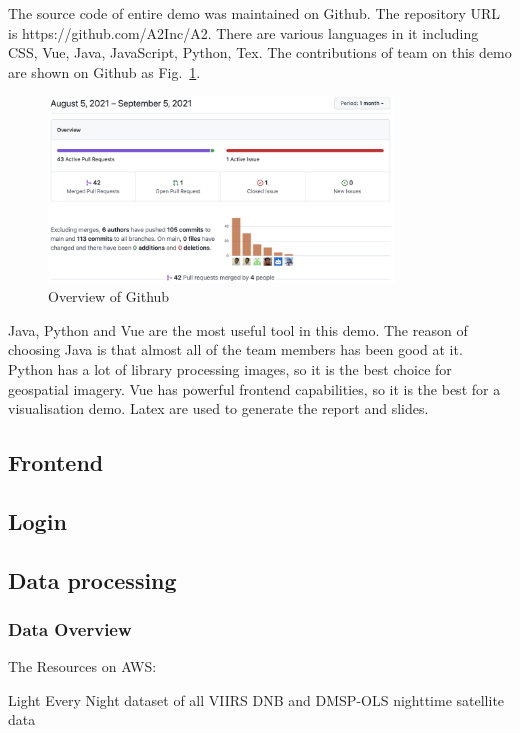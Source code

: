 \documentclass[conference]{IEEEtran}
\begin{document}
The source code of entire demo was maintained on Github. The repository URL is https://github.com/A2Inc/A2. There are various languages in it including 
CSS, Vue, Java, JavaScript, Python, Tex. The contributions of team on this demo are shown on Github as Fig.~\ref{fig3}.

\begin{figure}[htbp]
    \centerline{\includegraphics[width=260pt]{images/github.png}}
    \caption{Overview of Github}
    \label{fig3}
\end{figure}

Java, Python and Vue are the most useful tool in this demo. The reason of choosing Java is that almost all of the team members has been good at it. Python 
has a lot of library processing images, so it is the best choice for geospatial imagery. Vue has powerful frontend capabilities, so it is the best for a 
visualisation demo. Latex are used to generate the report and slides.

\subsection{Frontend}

\subsection{Login}

\subsection{Data processing}

\subsubsection{Data Overview}

The Resources on AWS: 


Light Every Night dataset of all VIIRS DNB and DMSP-OLS nighttime satellite data
\end{document}
